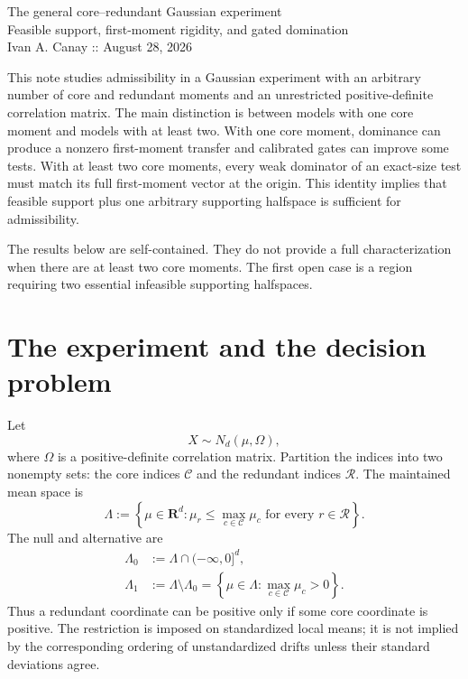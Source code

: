 \documentclass[12pt]{article}
\theoremstyle{definition}
\theoremstyle{remark}
\newcommand{\R}{\mathbf R}
\newcommand{\cC}{\mathcal C}
\newcommand{\cR}{\mathcal R}
\newcommand{\1}{\mathbf 1}
\begin{document}
\begin{center}
{\Large The general core--redundant Gaussian experiment}\\[4pt]
{\large Feasible support, first-moment rigidity, and gated domination}\\[4pt]
{\small Ivan A. Canay :: August 28, 2026}
\end{center}

\medskip

This note studies admissibility in a Gaussian experiment with an arbitrary
number of core and redundant moments and an unrestricted positive-definite
correlation matrix.  The main distinction is between models with one core
moment and models with at least two.  With one core moment, dominance can
produce a nonzero first-moment transfer and calibrated gates can improve some
tests.  With at least two core moments, every weak dominator of an exact-size
test must match its full first-moment vector at the origin.  This identity
implies that feasible support plus one arbitrary supporting halfspace is
sufficient for admissibility.

The results below are self-contained.  They do not provide a full
characterization when there are at least two core moments.  The first open
case is a region requiring two essential infeasible supporting halfspaces.

\section{The experiment and the decision problem}

Let
\[
X\sim N_d(\mu,\Omega),
\]
where $\Omega$ is a positive-definite correlation matrix.  Partition the
indices into two nonempty sets: the core indices $\cC$ and the redundant
indices $\cR$.  The maintained mean space is
\begin{equation}\label{eq:Lambda}
\Lambda
:=
\left\{\mu\in\R^d:
\mu_r\le \max_{c\in\cC}\mu_c
\text{ for every }r\in\cR
\right\}.
\end{equation}
The null and alternative are
\begin{align}
\Lambda_0
&:=\Lambda\cap(-\infty,0]^d,\label{eq:null}\\
\Lambda_1
&:=\Lambda\setminus\Lambda_0
=\left\{\mu\in\Lambda:
\max_{c\in\cC}\mu_c>0\right\}.\label{eq:alternative}
\end{align}
Thus a redundant coordinate can be positive only if some core coordinate is
positive.  The restriction is imposed on standardized local means; it is not
implied by the corresponding ordering of unstandardized drifts unless their
standard deviations agree.
\end{document}
